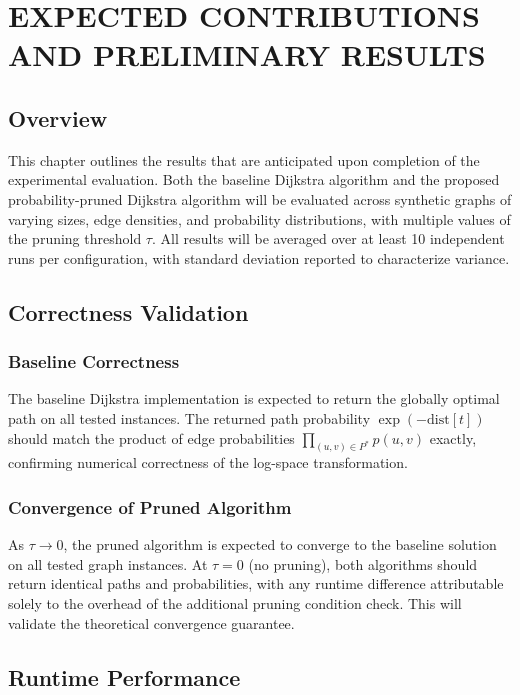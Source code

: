 \chapter{EXPECTED CONTRIBUTIONS AND PRELIMINARY RESULTS}\label{chap:results}

\section{Overview}

This chapter outlines the results that are anticipated upon completion of the experimental evaluation. Both the baseline Dijkstra algorithm and the proposed probability-pruned Dijkstra algorithm will be evaluated across synthetic graphs of varying sizes, edge densities, and probability distributions, with multiple values of the pruning threshold $\tau$. All results will be averaged over at least 10 independent runs per configuration, with standard deviation reported to characterize variance.

\section{Correctness Validation}

\subsection{Baseline Correctness}

The baseline Dijkstra implementation is expected to return the globally optimal path on all tested instances. The returned path probability $\exp(-\text{dist}[t])$ should match the product of edge probabilities $\prod_{(u,v)\in P^*} p(u,v)$ exactly, confirming numerical correctness of the log-space transformation.

\subsection{Convergence of Pruned Algorithm}

As $\tau \to 0$, the pruned algorithm is expected to converge to the baseline solution on all tested graph instances. At $\tau = 0$ (no pruning), both algorithms should return identical paths and probabilities, with any runtime difference attributable solely to the overhead of the additional pruning condition check. This will validate the theoretical convergence guarantee.

\section{Runtime Performance}

